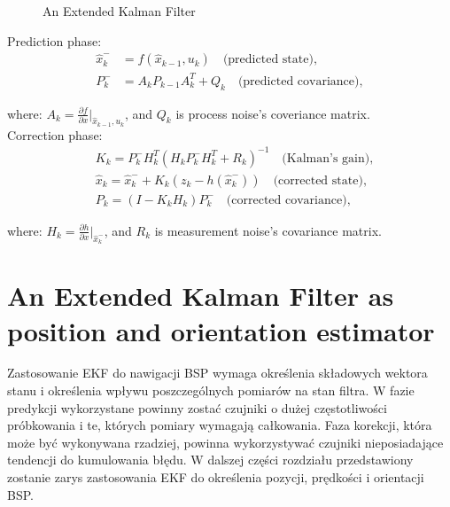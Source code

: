 \begin{figure}[!h]
	\centering
	\caption{An Extended Kalman Filter}
	\label{kf_diagram}
\end{figure}

Prediction phase:
\[
\begin{aligned}
	\hat{x}_k^- & = f(\hat{x}_{k-1}, u_k) \quad \text{(predicted state)}, \\
	P_k^- & = A_k P_{k-1} A_k^T + Q_k \quad \text{(predicted covariance)},
\end{aligned}
\]

where: $A_k = \frac{\partial f}{\partial x}\Bigr|_{\hat{x}_{k-1}, u_k}$, and $Q_k$ is process noise's coveriance matrix.\\

Correction phase:
\[
\begin{aligned}
	&K_k = P_k^- H_k^T (H_k P_k^- H_k^T + R_k)^{-1} \quad \text{(Kalman's gain)}, \\
	&\hat{x}_k = \hat{x}_k^- + K_k(z_k - h(\hat{x}_k^-)) \quad \text{(corrected state)}, \\
	&P_k = (I - K_k H_k) P_k^- \quad \text{(corrected covariance)},
\end{aligned}
\]

where: $H_k = \frac{\partial h}{\partial x}\Bigr|_{\hat{x}_k^-}$, and $R_k$ is measurement noise's covariance matrix.



\section{An Extended Kalman Filter as position and orientation estimator}

Zastosowanie EKF do nawigacji BSP wymaga określenia składowych wektora stanu i określenia wpływu poszczególnych pomiarów na stan filtra. W fazie predykcji wykorzystane powinny zostać czujniki o dużej częstotliwości próbkowania i te, których pomiary wymagają całkowania. Faza korekcji, która może być wykonywana rzadziej, powinna wykorzystywać czujniki nieposiadające tendencji do kumulowania błędu. W dalszej części rozdziału przedstawiony zostanie zarys zastosowania EKF do określenia pozycji, prędkości i orientacji BSP.\\

